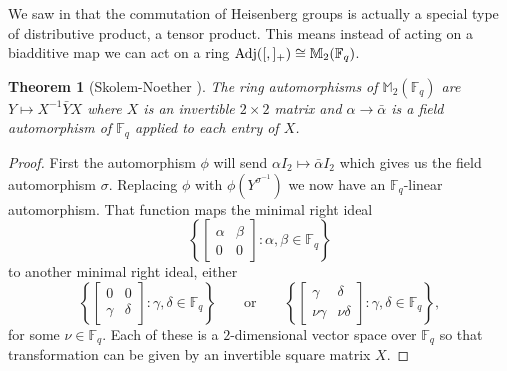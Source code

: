 \documentclass{toc}
\numberwithin{equation}{section}
\theoremstyle{plain}       %
\newtheorem{thm}[equation]{Theorem}
\theoremstyle{remark}
\theoremstyle{definition}
\numberwithin{figure}{section}
\numberwithin{table}{section}
\newcommand{\bbF}{\mathbb{F}}  %
\begin{document}
We saw in  that the commutation of Heisenberg groups is
actually a special type of distributive product, a tensor product.  This means
instead of acting on a biadditive map we can act on a ring ${\rm
Adj}([,]_+)\cong \mathbb{M}_2(\bbF_q)$.


\begin{thm}[Skolem-Noether {\cite[p. 237]{JacII}}] 
The ring automorphisms of $\mathbb{M}_2(\bbF_q)$ are $Y\mapsto X^{-1}\bar{Y}X$
where $X$ is an invertible $2\times 2$ matrix and $\alpha \to \bar{\alpha}$ is a
field automorphism of $\bbF_q$ applied to each entry of $X$.
\end{thm}
\begin{proof}
First the automorphism $\phi$ will send $\alpha I_2\mapsto \bar{\alpha}I_2$
which gives us the field automorphism $\sigma$.  Replacing $\phi$ with
$\phi(Y^{\sigma^{-1}})$ we now have an $\bbF_q$-linear automorphism.  That
function maps the minimal right ideal
\[
  \left\{\left[\begin{smallmatrix}\alpha &
        \beta \\ 0 & 0\end{smallmatrix}\right] : \alpha,\beta\in \bbF_q\right\}
\]
to
another minimal right ideal, either
\[
  \left\{\left[\begin{smallmatrix} 0 & 0 \\
      \gamma & \delta \end{smallmatrix}\right]: \gamma,\delta\in
  \bbF_q\right\} \qquad \text{or}
\qquad \left\{\left[\begin{smallmatrix}\gamma & \delta \\ \nu \gamma &
      \nu\delta\end{smallmatrix}\right]:\gamma,\delta\in
  \bbF_q\right\},
\]
for some $\nu\in \bbF_q$.  Each of these is a
$2$-dimensional vector space over $\bbF_q$ so that transformation can
be given by an invertible square matrix $X$.
\end{proof}
\end{document}
